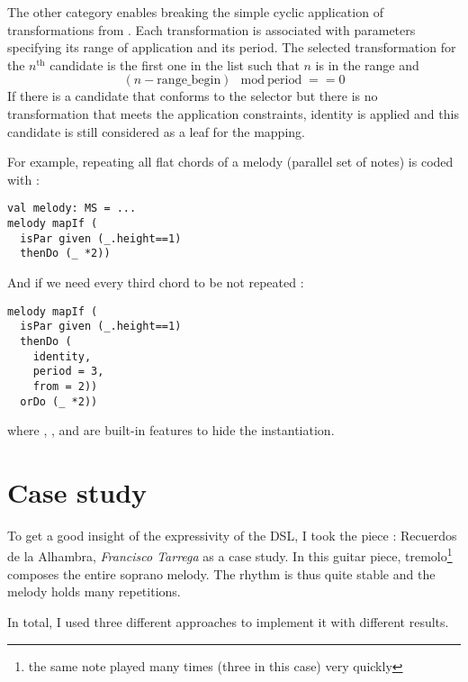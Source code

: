 \documentclass[twocolumn, 11pt]{article}
\begin{document}
The other category enables breaking the simple cyclic application of transformations from . Each transformation is associated with parameters specifying its range of application and its period. The selected transformation for the $n^{\text{th}}$ candidate is the first one in the list such that $n$ is in the range and
$$(n - \text{range\_begin}) \mod \text{period} == 0$$
If there is a candidate that conforms to the selector but there is no transformation that meets the application constraints, identity is applied and this candidate is still considered as a leaf for the mapping.



For example, repeating all flat chords of a melody (parallel set of notes) is coded with :
\begin{lstlisting}
val melody: MS = ...
melody mapIf (
  isPar given (_.height==1)
  thenDo (_ *2))
\end{lstlisting}
And if we need every third chord to be not repeated :
\begin{lstlisting}
melody mapIf (
  isPar given (_.height==1)
  thenDo (
    identity,
    period = 3,
    from = 2))
  orDo (_ *2))
\end{lstlisting}
where , ,  and  are built-in features to hide the  instantiation.



\section{Case study}
To get a good insight of the expressivity of the DSL, I took the piece : Recuerdos de la Alhambra, \emph{Francisco Tarrega} as a case study. In this guitar piece, tremolo\footnote{the same note played many times (three in this case) very quickly} composes the entire soprano melody. The rhythm is thus quite stable and the melody holds many repetitions.

In total, I used three different approaches to implement it with different results.
\end{document}
